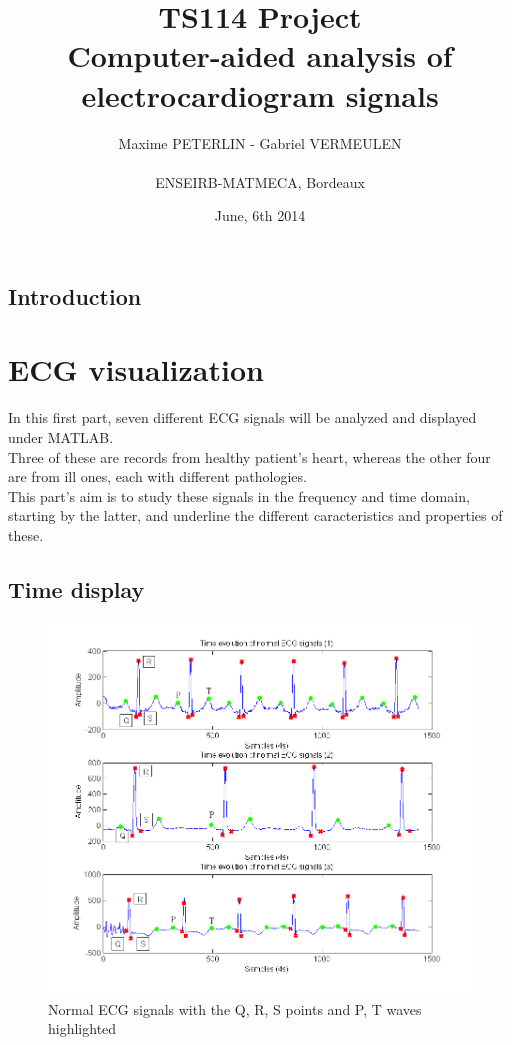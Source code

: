 \documentclass[11pt]{report}
\title{\textbf{TS114 Project}\\Computer-aided analysis of electrocardiogram signals}
\author{{Maxime PETERLIN - Gabriel VERMEULEN }\\\\{ENSEIRB-MATMECA, Bordeaux}}
\date{June, 6th 2014}
\begin{document}
\maketitle

\tableofcontents

\newpage
\section*{Introduction}


\chapter{ECG visualization}
	In this first part, seven different ECG signals will be analyzed and displayed under MATLAB. \\Three of these are records from healthy patient's heart, whereas the other four are from ill ones, each with different pathologies.\\
	This part's aim is to study these signals in the frequency and time domain, starting by the latter, and underline the different caracteristics and properties of these.

	\section{Time display}
		\begin{figure}[ht]
			\centering
			\includegraphics[scale=0.65]{images/Q311_1.png}
			\caption{Normal ECG signals with the Q, R, S points and P, T waves highlighted}
			\label{Q311_1}
		\end{figure}
\end{document}
